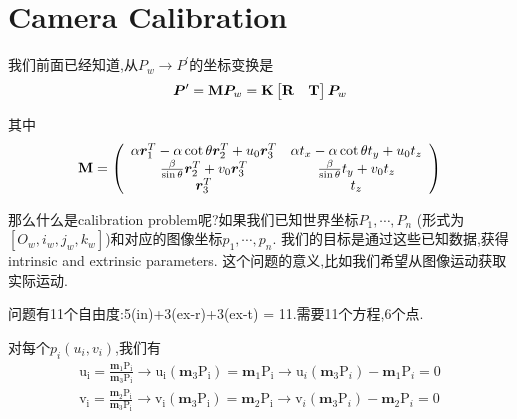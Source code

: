 \chapter{Camera Calibration}

我们前面已经知道,从$P_w \to P^\prime$的坐标变换是
\begin{equation}
	\bm P^\prime = \bold{M} \bm P_w = \bold{K}
	\begin{bmatrix}
		\bold{R} & \bold{T}
	\end{bmatrix} \bm P_w
\end{equation}

其中
\begin{equation}
	\bold{M}=\left(\begin{array}{cc}
		\alpha \boldsymbol{r}_{1}^{T}-\alpha \cot \theta \boldsymbol{r}_{2}^{T}+u_{0} \boldsymbol{r}_{3}^{T} & \alpha t_{x}-\alpha \cot \theta t_{y}+u_{0} t_{z} \\
		\frac{\beta}{\sin \theta} \boldsymbol{r}_{2}^{T}+v_{0} \boldsymbol{r}_{3}^{T} & \frac{\beta}{\sin \theta} t_{y}+v_{0} t_{z} \\
		\boldsymbol{r}_{3}^{T} & t_{z}
	\end{array}\right)
\end{equation}

那么什么是calibration problem呢?如果我们已知世界坐标$P_1, \cdots, P_n$
(形式为$[O_w, i_w, j_w, k_w]$)和对应的图像坐标$p_1,\cdots, p_n$.
我们的目标是通过这些已知数据,获得intrinsic and extrinsic parameters.
这个问题的意义,比如我们希望从图像运动获取实际运动.

问题有11个自由度:5(in)+3(ex-r)+3(ex-t) = 11.需要11个方程,6个点.

对每个$p_i(u_i, v_i)$,我们有
\begin{equation}
	\begin{array}{l}
		\mathrm{u}_{\mathrm{i}}=\frac{\mathbf{m}_{1} \mathrm{P}_{\mathrm{i}}}{\mathbf{m}_{3} \mathrm{P}_{\mathrm{i}}} \rightarrow \mathrm{u}_{\mathrm{i}}\left(\mathbf{m}_{3} \mathrm{P}_{\mathrm{i}}\right)=\mathbf{m}_{1} \mathrm{P}_{\mathrm{i}} \rightarrow \mathrm{u}_{i}\left(\mathbf{m}_{3} \mathrm{P}_{i}\right)-\mathbf{m}_{1} \mathrm{P}_{i}=0 \\
		\mathrm{v}_{\mathrm{i}}=\frac{\mathbf{m}_{2} \mathrm{P}_{\mathrm{i}}}{\mathbf{m}_{3} \mathrm{P}_{\mathrm{i}}} \rightarrow \mathrm{v}_{\mathrm{i}}\left(\mathbf{m}_{3} \mathrm{P}_{\mathrm{i}}\right)=\mathbf{m}_{2} \mathrm{P}_{\mathrm{i}} \rightarrow \mathrm{v}_{i}\left(\mathbf{m}_{3} \mathrm{P}_{i}\right)-\mathbf{m}_{2} \mathrm{P}_{i}=0
	\end{array}
\end{equation}

